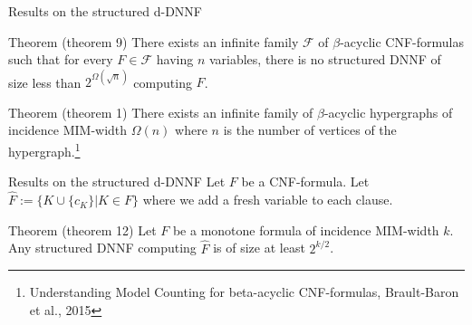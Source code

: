 \begin{frame}[t]{Results on the structured d-DNNF}
	\begin{block}{Theorem (theorem 9)}
		There exists an infinite family $\mathcal{F}$ of $\beta$-acyclic CNF-formulas such that for every $F\in \mathcal{F}$ having $n$ variables, there is no structured DNNF of size less than $2^{\Omega(\sqrt n)}$ computing $F$.
	\end{block}

	\begin{block}{Theorem (theorem 1)}
		There exists an infinite family of $\beta$-acyclic hypergraphs of incidence MIM-width $\Omega(n)$ where $n$ is the number of vertices of the hypergraph.\footnote{Understanding Model Counting for beta-acyclic CNF-formulas, Brault-Baron et al., 2015}
	\end{block}
\end{frame}

\begin{frame}[t]{Results on the structured d-DNNF}
	Let $F$ be a CNF-formula. Let $\hat{F} := \{K \cup \{c_K\} | K \in F\}$ where we add a fresh variable to each clause.
	\begin{block}{Theorem (theorem 12)}
		Let $F$ be a monotone formula of incidence MIM-width $k$. Any structured DNNF computing $\hat{F}$ is of size at least $2^{k/2}$.
	\end{block}
\end{frame}
